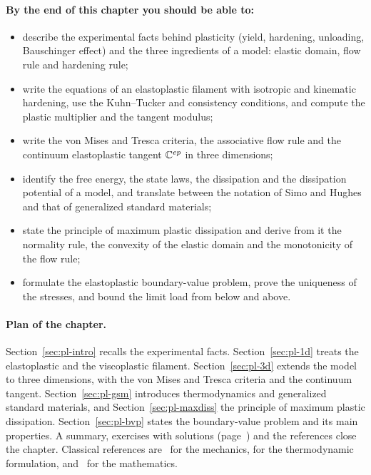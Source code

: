\paragraph{By the end of this chapter you should be able to:}
\begin{itemize}
  \item describe the experimental facts behind plasticity (yield, hardening,
  unloading, Bauschinger effect) and the three ingredients of a model:
  elastic domain, flow rule and hardening rule;
  \item write the equations of an elastoplastic filament with isotropic and
  kinematic hardening, use the Kuhn--Tucker and consistency conditions, and
  compute the plastic multiplier and the tangent modulus;
  \item write the von Mises and Tresca criteria, the associative flow rule and
  the continuum elastoplastic tangent $\mathbb{C}^{ep}$ in three dimensions;
  \item identify the free energy, the state laws, the dissipation and the
  dissipation potential of a model, and translate between the notation of
  Simo and Hughes and that of generalized standard materials;
  \item state the principle of maximum plastic dissipation and derive from it
  the normality rule, the convexity of the elastic domain and the
  monotonicity of the flow rule;
  \item formulate the elastoplastic boundary-value problem, prove the
  uniqueness of the stresses, and bound the limit load from below and above.
\end{itemize}

\paragraph{Plan of the chapter.} Section~\ref{sec:pl-intro} recalls the experimental facts. Section~\ref{sec:pl-1d} treats the elastoplastic and the viscoplastic filament. Section~\ref{sec:pl-3d} extends the model to three dimensions, with the von Mises and Tresca criteria and the continuum tangent. Section~\ref{sec:pl-gsm} introduces thermodynamics and generalized standard materials, and Section~\ref{sec:pl-maxdiss} the principle of maximum plastic dissipation. Section~\ref{sec:pl-bvp} states the boundary-value problem and its main properties. A summary, exercises with solutions (page~\pageref{sec:pl-exo}) and the references close the chapter. Classical references are~\cite{SimoHughes1998,Lubliner1990,LemaitreChaboche1990,Salencon2002,Maitournam2012} for the mechanics, \cite{KondoMaitournam2023} for the thermodynamic formulation, and~\cite{HanReddy2013,Temam1983,Nguyen2000} for the mathematics.

